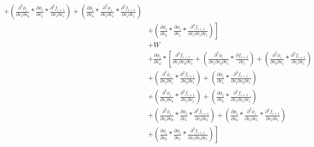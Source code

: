 \documentclass[12pt,letter]{article}
\begin{document}
\begin{equation}
\begin{split}
	\left.
	+ \left(\frac{\partial^2 \phi_i}{\partial v_i \partial v_b} * \frac{\partial \phi_i}{\partial v_c} * \frac{\partial^2 f_{i+1}}{\partial v_i \partial v_i}\right) + 
	\left(\frac{\partial \phi_i}{\partial v_b} * \frac{\partial^2 \phi_i}{\partial v_i \partial v_c} * \frac{\partial^2 f_{i+1}}{\partial v_i \partial v_i}\right) 
	\right.
	\\
	&
	\left.
	+ \left(\frac{\partial \phi_i}{\partial v_b} * \frac{\partial \phi_i}{\partial v_c} * \frac{\partial^3 f_{i+1}}{\partial v_i \partial v_i \partial v_i}\right)\right]
	\\
	&+
	W
	\\
	&+
	\frac{\partial \phi_i}{\partial v_a} * 
	\left[\frac{\partial^3 f_{i+1}}{\partial v_i \partial v_b \partial v_c} + 
	\left(\frac{\partial^3 \phi_i}{\partial v_i \partial v_b \partial v_c} * \frac{\partial f_{i+1}}{\partial v_i}\right) + 
	\left(\frac{\partial^2 \phi_i}{\partial v_b \partial v_c} * \frac{\partial^2 f_{i+1}}{\partial v_i \partial v_i}\right) 
	\right.
	\\
	&
	\left.
	+ \left(\frac{\partial^2 \phi_i}{\partial v_i \partial v_c} * \frac{\partial^2 f_{i+1}}{\partial v_b \partial v_i}\right) + 
	\left(\frac{\partial \phi_i}{\partial v_c} * \frac{\partial^3 f_{i+1}}{\partial v_i \partial v_b \partial v_i}\right) 
	\right.
	\\
	&
	\left.
	+ \left(\frac{\partial^2 \phi_i}{\partial v_i \partial v_b} * \frac{\partial^2 f_{i+1}}{\partial v_i \partial v_c}\right) + 
	\left(\frac{\partial \phi_i}{\partial v_b} * \frac{\partial^3 f_{i+1}}{\partial v_i \partial v_i \partial v_c}\right) 
	\right.
	\\
	&
	\left.
	+ \left(\frac{\partial^2 \phi_i}{\partial v_i \partial v_b} * \frac{\partial \phi_i}{\partial v_c} * \frac{\partial^2 f_{i+1}}{\partial v_i \partial v_i}\right) + 
	\left(\frac{\partial \phi_i}{\partial v_b} * \frac{\partial^2 \phi_i}{\partial v_i \partial v_c} * \frac{\partial^2 f_{i+1}}{\partial v_i \partial v_i}\right) 
	\right.
	\\
	&
	\left.
	+ \left(\frac{\partial \phi_i}{\partial v_b} * \frac{\partial \phi_i}{\partial v_c} * \frac{\partial^3 f_{i+1}}{\partial v_i \partial v_i \partial v_i}\right)\right]
	\end{split}
	\end{equation}
\end{document}
